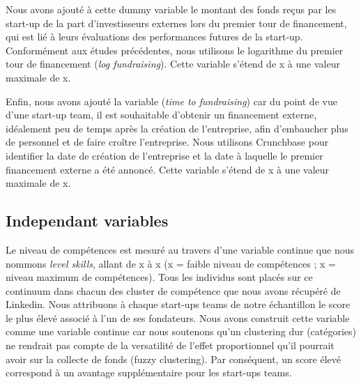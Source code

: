 \documentclass[12pt]{article}
\begin{document}
Nous avons ajouté à cette dummy variable le montant des fonds reçus par les start-up de la part d'investisseurs externes lors du premier tour de financement, qui est lié à leurs évaluations des performances futures de la start-up. Conformément aux études précédentes, nous utilisons le logarithme du premier tour de financement (\textit{log fundraising}). Cette variable s'étend de x à une valeur maximale de x.

Enfin, nous avons ajouté la variable (\textit{time to fundraising}) car du point de vue d'une start-up team, il est souhaitable d'obtenir un financement externe, idéalement peu de temps après la création de l'entreprise, afin d'embaucher plus de personnel et de faire croître l'entreprise. Nous utilisons Crunchbase pour identifier la date de création de l'entreprise et la date à laquelle le premier financement externe a été annoncé. Cette variable s'étend de x à une valeur maximale de x.

\subsection{Independant variables}

Le niveau de compétences est mesuré au travers d'une variable continue que nous nommons \textit{level skills}, allant de x à x (x = faible niveau de compétences ; x = niveau maximum de compétences). Tous les individus sont placés sur ce continuum dans chacun des cluster de compétence que nous avons récupéré de Linkedin. Nous attribuons à chaque start-ups teams de notre échantillon le score le plus élevé associé à l'un de ses fondateurs. Nous avons construit cette variable comme une variable continue car nous soutenons qu'un clustering dur (catégories) ne rendrait pas compte de la versatilité de l'effet proportionnel qu'il pourrait avoir sur la collecte de fonds (fuzzy clustering). Par conséquent, un score élevé correspond à un avantage supplémentaire pour les start-ups teams.
\end{document}
